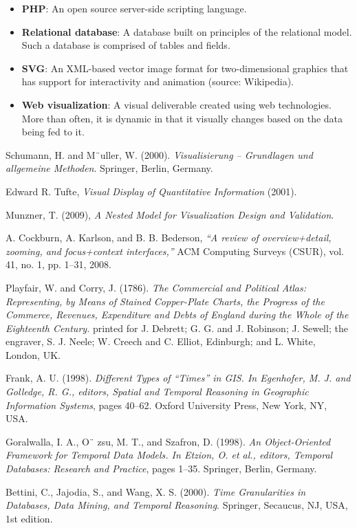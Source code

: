 \documentclass[12pt]{article}
\begin{document}
\begin{itemize}
\item[] \textbf{PHP}: An open source server-side scripting language.
\item[] \textbf{Relational database}: A database built on principles of the relational model. Such a database is comprised of tables and fields.
\item[] \textbf{SVG}: An XML-based vector image format for two-dimensional graphics that has support for interactivity and animation (source: Wikipedia).
\item[] \textbf{Web visualization}: A visual deliverable created using web technologies. More than often, it is dynamic in that it visually changes based on the data being fed to it. 
\end{itemize}

\vfill

\begin{thebibliography}{1}

   Schumann, H. and M¨uller, W. (2000). {\em Visualisierung – Grundlagen und allgemeine Methoden}. Springer, Berlin, Germany.

    Edward R. Tufte, {\em Visual Display of Quantitative Information} (2001).

   Munzner, T. (2009), {\em A Nested Model for Visualization Design and Validation}.

   A. Cockburn, A. Karlson, and B. B. Bederson, {\em “A review of overview+detail, zooming, and focus+context interfaces,”} ACM Computing Surveys (CSUR), vol. 41, no. 1, pp. 1–31, 2008.
  
   Playfair, W. and Corry, J. (1786). {\em The Commercial and Political Atlas: Representing, by Means of Stained Copper-Plate Charts, the Progress of the Commerce, Revenues, Expenditure and Debts of England during the Whole of the Eighteenth Century.} printed for J. Debrett; G. G. and J. Robinson; J. Sewell; the engraver, S. J. Neele; W. Creech and C. Elliot, Edinburgh; and L. White, London, UK.
  
   Frank, A. U. (1998). {\em Different Types of “Times” in GIS. In Egenhofer, M. J. and Golledge, R. G., editors, Spatial and Temporal Reasoning in Geographic Information Systems}, pages 40–62. Oxford University Press, New York, NY, USA.
  
   Goralwalla, I. A., O¨ zsu, M. T., and Szafron, D. (1998). {\em An Object-Oriented Framework for Temporal Data Models. In Etzion, O. et al., editors, Temporal Databases: Research and Practice}, pages 1–35. Springer, Berlin, Germany.
  
   Bettini, C., Jajodia, S., and Wang, X. S. (2000). {\em Time Granularities in Databases, Data Mining, and Temporal Reasoning}. Springer, Secaucus, NJ, USA, 1st edition.

  \end{thebibliography}
\end{document}
